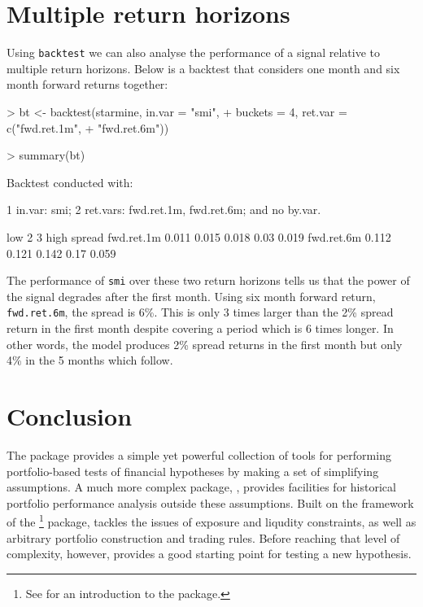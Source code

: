 \documentclass[a4paper]{report}
\begin{document}
\begin{article}
\section*{Multiple return horizons}

Using \texttt{backtest} we can also analyse the performance of a
signal relative to multiple return horizons.  Below is a backtest that
considers one month and six month forward returns together:


\begin{Schunk}
\begin{Sinput}
> bt <- backtest(starmine, in.var = "smi", 
+     buckets = 4, ret.var = c("fwd.ret.1m", 
+         "fwd.ret.6m"))
\end{Sinput}
\end{Schunk}


\begin{Schunk}
\begin{Sinput}
> summary(bt)
\end{Sinput}
\begin{Soutput}
Backtest conducted with:

1 in.var: smi;
2 ret.vars: fwd.ret.1m, fwd.ret.6m;
and no by.var.

             low     2     3 high spread
fwd.ret.1m 0.011 0.015 0.018 0.03  0.019
fwd.ret.6m 0.112 0.121 0.142 0.17  0.059
\end{Soutput}
\end{Schunk}



The performance of \texttt{smi} over these two return horizons tells
us that the power of the signal degrades after the first month.  Using
six month forward return, \texttt{fwd.ret.6m}, the spread is 6\%.
This is only 3 times larger than the 2\% spread return in the first
month despite covering a period which is 6 times longer. In other
words, the model produces 2\% spread returns in the first month but
only 4\% in the 5 months which follow.


\section*{Conclusion}

The  package provides a simple yet powerful collection
of tools for performing portfolio-based tests of financial hypotheses
by making a set of simplifying assumptions.  A much more complex
package, , provides facilities for historical
portfolio performance analysis outside these assumptions.  Built on
the framework of the \footnote{See \cite{kane:david}
  for an introduction to the  package.} package,
 tackles the issues of exposure and liqudity
constraints, as well as arbitrary portfolio construction and trading
rules.  Before reaching that level of complexity, however,
 provides a good starting point for testing a new
hypothesis.


\end{article}
\end{document}
